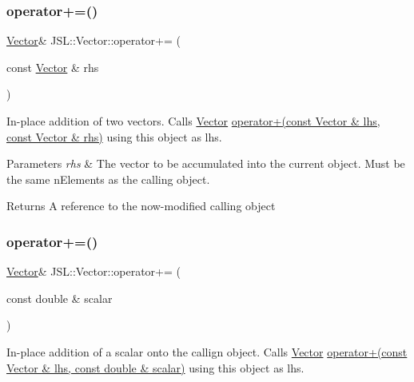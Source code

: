 \subsubsection{\texorpdfstring{operator+=()}{operator+=()}\hspace{0.1cm}{\footnotesize\ttfamily [1/2]}}
{\footnotesize\ttfamily \hyperlink{classJSL_1_1Vector}{Vector}\& J\+S\+L\+::\+Vector\+::operator+= (\begin{DoxyParamCaption}\item[{const \hyperlink{classJSL_1_1Vector}{Vector} \&}]{rhs }\end{DoxyParamCaption})\hspace{0.3cm}{\ttfamily [inline]}}



In-\/place addition of two vectors. Calls \hyperlink{classJSL_1_1Vector}{Vector} \hyperlink{namespaceJSL_ae6530b77174d0dfae8e0d6e2a810f672}{operator+(const Vector \& lhs, const Vector \& rhs)} using this object as lhs. 


\begin{DoxyParams}{Parameters}
{\em rhs} & The vector to be accumulated into the current object. Must be the same n\+Elements as the calling object. \\
\hline
\end{DoxyParams}
\begin{DoxyReturn}{Returns}
A reference to the now-\/modified calling object 
\end{DoxyReturn}
\mbox{\label{classJSL_1_1Vector_aeca45a175db04725394a1b576507e708}} 
\subsubsection{\texorpdfstring{operator+=()}{operator+=()}\hspace{0.1cm}{\footnotesize\ttfamily [2/2]}}
{\footnotesize\ttfamily \hyperlink{classJSL_1_1Vector}{Vector}\& J\+S\+L\+::\+Vector\+::operator+= (\begin{DoxyParamCaption}\item[{const double \&}]{scalar }\end{DoxyParamCaption})\hspace{0.3cm}{\ttfamily [inline]}}



In-\/place addition of a scalar onto the callign object. Calls \hyperlink{classJSL_1_1Vector}{Vector} \hyperlink{namespaceJSL_a4b293e2ac3df51113e80022cb3c2ac99}{operator+(const Vector \& lhs, const double \& scalar)} using this object as lhs. 


